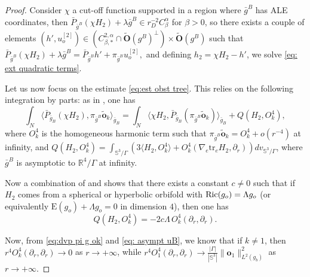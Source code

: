 \documentclass[11pt,reqno]{amsart}
\numberwithin{equation}{section}
\newcommand{\tr}{\mathrm{tr}}
\newcommand{\Ric}{{\rm Ric}}
\newcommand{\E}{\mathrm{E}}
\theoremstyle{definition}
\theoremstyle{remark}
\begin{document}
\begin{proof}
    Consider $\chi$ a cut-off function supported in a region where $\bar{g}^B$ has ALE coordinates, then $\bar{P}_{\bar{g}^B}(\chi H_2)+\lambda \bar{g}^B\in r_D^{-2}C^{\alpha}_{\beta}$ for $\beta>0$, so there exists a couple of elements $(h',u_o^{[2]})\in (C^{2,\alpha}_{\beta,*}\cap \tilde{\mathbf{O}}(g^B)^\perp)\times \tilde{\mathbf{O}}(g^B)$ such that 
    $\bar{P}_{\bar{g}^B}(\chi H_2)+\lambda \bar{g}^B = \bar{P}_{\bar{g}^B}h' + {\pi_{\bar{g}^B}}u_o^{[2]},$ and defining $h_2 = \chi H_2-h'$, we solve \eqref{eq: ext quadratic terms}.

    Let us now focus on the estimate \eqref{eq:est obst tree}. This relies on the following integration by parts: as in \cite[Proposition 5.9]{ozu2}, one has
    \begin{equation}\label{eq:IBP P H2}
        \int_N \langle \bar{P}_{\bar{g}_B} (\chi H_2),\pi_{\bar{g}^B}\tilde{\mathbf{o}}_k \rangle_{\bar{g}_B} = \int_N \langle \chi H_2,\bar{P}_{\bar{g}_B}(\pi_{\bar{g}^B}\tilde{\mathbf{o}}_k) \rangle_{\bar{g}_B} + Q(H_2, O_k^4),
    \end{equation}
where $O_k^4$ is the homogeneous harmonic term such that $\pi_{\bar{g}^B}\tilde{\mathbf{o}}_k = O^4_k + o(r^{-4})$ at infinity, and $Q(H_2,O_k^4) = \int_{\mathbb{S}^3/\Gamma}(3\langle H_2,O_k^4 \rangle+O_k^4(\nabla_e\tr_eH_2,\partial_r))dv_{\mathbb{S}^3/\Gamma}$, where $\bar{g}^B$ is asymptotic to $\mathbb{R}^4/\Gamma$ at infinity.

Now a combination of \cite[Proposition 11.18]{do3} and \cite[(86)]{ozu2} shows that there exists a constant $c\neq 0$ such that if $H_2$ comes from a spherical or hyperbolic orbifold with $\Ric(g_o)=\Lambda g_o$ (or equivalently $\E(g_o)+\Lambda g_o = 0$ in dimension $4$), then one has 
$$ Q(H_2,O_k^4) = -2c\Lambda \,O_k^4(\partial_r,\partial_r). $$

Now, from \eqref{eq:dvp pi g ok} and \eqref{eq: asympt uB}, we know that if $k \neq 1$, then $r^4O_k^4(\partial_r,\partial_r)\to 0$ as $r\to+\infty$, while $r^4O_1^4(\partial_r,\partial_r)\to \frac{|\Gamma|}{|\mathbb{S}^3|} \|\mathbf{o}_1\|^2_{L^2(g_b)}$ as $r\to+\infty$.
\end{proof}
\end{document}
